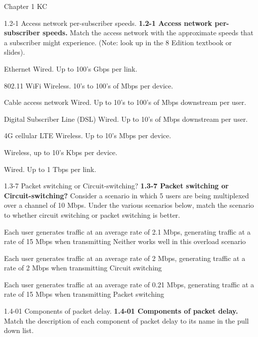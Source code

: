 \documentclass[a4paper]{article}
\begin{document}
\begin{quiz}{Chapter 1 KC}

\begin{matching}[points=1]{1.2-1 Access network per-subscriber speeds.}
\textbf{1.2-1 Access network per-subscriber speeds.}
Match the access network with the approximate speeds that a subscriber might experience. 
(Note: look up in the 8 Edition textbook or slides).

\item Ethernet \answer Wired. Up to 100's Gbps per link.
\item 802.11 WiFi \answer Wireless. 10's to 100's of Mbps per device.
\item Cable access network \answer Wired. Up to 10's to 100's of Mbps downstream per user.
\item Digital Subscriber Line (DSL) \answer Wired. Up to 10's of Mbps downstream per user.
\item 4G cellular LTE \answer Wireless. Up to 10's Mbps per device.
\item \answer Wireless, up to 10's Kbps per device.
\item \answer Wired. Up to 1 Tbps per link.
\end{matching}

\begin{matching}[points=1]{1.3-7 Packet switching or Circuit-switching?}
\textbf{1.3-7 Packet switching or Circuit-switching?}
Consider a scenario in which 5 users are being multiplexed over a channel of 10 Mbps.  
Under the various scenarios below, match the scenario to whether circuit switching or packet switching is better.

\item Each user generates traffic at an average rate of 2.1 Mbps, generating traffic at a rate of 15 Mbps when transmitting \answer Neither works well in this overload scenario
\item Each user generates traffic at an average rate of 2 Mbps, generating traffic at a rate of 2 Mbps when transmitting \answer Circuit switching
\item Each user generates traffic at an average rate of 0.21 Mbps, generating traffic at a rate of 15 Mbps when transmitting \answer Packet switching
\end{matching}

\begin{matching}[points=1]{1.4-01 Components of packet delay.}
\textbf{1.4-01 Components of packet delay.}
Match the description of each component of packet delay to its name in the pull down list.


\end{matching}
\end{quiz}
\end{document}
